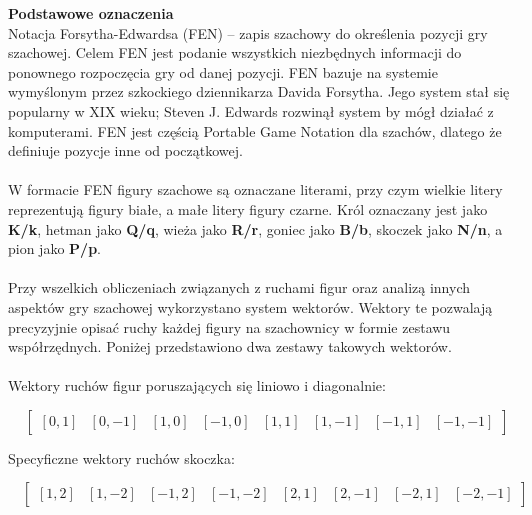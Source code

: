 \documentclass[12pt,a4paper]{article}
\begin{document}
\noindent \textbf{Podstawowe oznaczenia}\\
Notacja Forsytha-Edwardsa (FEN) – zapis szachowy do określenia pozycji gry szachowej. Celem FEN jest podanie wszystkich niezbędnych informacji do ponownego rozpoczęcia gry od danej pozycji. FEN bazuje na systemie wymyślonym przez szkockiego dziennikarza Davida Forsytha. Jego system stał się popularny w XIX wieku; Steven J. Edwards rozwinął system by mógł działać z komputerami. FEN jest częścią Portable Game Notation dla szachów, dlatego że definiuje pozycje inne od początkowej.
\\\\
W formacie FEN figury szachowe są oznaczane literami, przy czym wielkie litery reprezentują figury białe, a małe litery figury czarne. Król oznaczany jest jako \textbf{K/k}, hetman jako \textbf{Q/q}, wieża jako \textbf{R/r}, goniec jako \textbf{B/b}, skoczek jako \textbf{N/n}, a pion jako \textbf{P/p}.
\\\\
Przy wszelkich obliczeniach związanych z ruchami figur oraz analizą innych aspektów gry szachowej wykorzystano system wektorów. Wektory te pozwalają precyzyjnie opisać ruchy każdej figury na szachownicy w formie zestawu współrzędnych. Poniżej przedstawiono dwa zestawy takowych wektorów.
\\\\
Wektory ruchów figur poruszających się liniowo i diagonalnie:

\[
\quad 
\begin{bmatrix}
    [0, 1] & [0, -1] & [1, 0] & [-1, 0] & [1, 1] & [1, -1] & [-1, 1] & [-1, -1]
\end{bmatrix}
\]

\noindent
Specyficzne wektory ruchów skoczka:

\[
\quad 
\begin{bmatrix}
    [1, 2] & [1, -2] & [-1, 2] & [-1, -2] & [2, 1] & [2, -1] & [-2, 1] & [-2, -1]
\end{bmatrix}
\]

\vspace{0.5cm}
\end{document}

